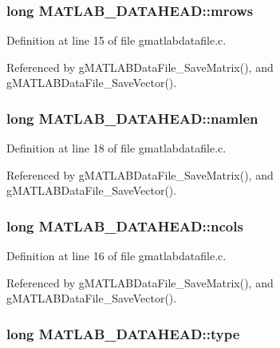 \hypertarget{structMATLAB__DATAHEAD_abf1ef02c93522915bd7fdf9f72df44b7}{
\subsubsection[{mrows}]{\setlength{\rightskip}{0pt plus 5cm}long {\bf MATLAB\_\-DATAHEAD::mrows}}}
\label{structMATLAB__DATAHEAD_abf1ef02c93522915bd7fdf9f72df44b7}


Definition at line 15 of file gmatlabdatafile.c.



Referenced by gMATLABDataFile\_\-SaveMatrix(), and gMATLABDataFile\_\-SaveVector().

\hypertarget{structMATLAB__DATAHEAD_ad6e65844dcff1eb1cf7bf8752ba9a91c}{
\subsubsection[{namlen}]{\setlength{\rightskip}{0pt plus 5cm}long {\bf MATLAB\_\-DATAHEAD::namlen}}}
\label{structMATLAB__DATAHEAD_ad6e65844dcff1eb1cf7bf8752ba9a91c}


Definition at line 18 of file gmatlabdatafile.c.



Referenced by gMATLABDataFile\_\-SaveMatrix(), and gMATLABDataFile\_\-SaveVector().

\hypertarget{structMATLAB__DATAHEAD_ae87d8eca5290fa03d01c79061498626f}{
\subsubsection[{ncols}]{\setlength{\rightskip}{0pt plus 5cm}long {\bf MATLAB\_\-DATAHEAD::ncols}}}
\label{structMATLAB__DATAHEAD_ae87d8eca5290fa03d01c79061498626f}


Definition at line 16 of file gmatlabdatafile.c.



Referenced by gMATLABDataFile\_\-SaveMatrix(), and gMATLABDataFile\_\-SaveVector().

\hypertarget{structMATLAB__DATAHEAD_ad3587e58da5ca6cbe3cd98d5e2f46202}{
\subsubsection[{type}]{\setlength{\rightskip}{0pt plus 5cm}long {\bf MATLAB\_\-DATAHEAD::type}}}
\label{structMATLAB__DATAHEAD_ad3587e58da5ca6cbe3cd98d5e2f46202}


